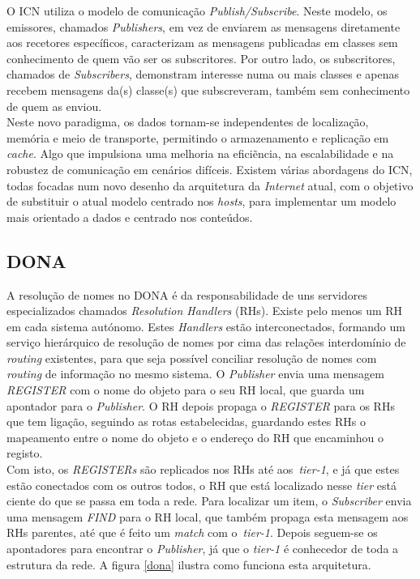 \documentclass[conference]{IEEEtran}
\begin{document}
O ICN utiliza o modelo de comunica\c{c}\~{a}o \textit{Publish/Subscribe}. Neste modelo, os emissores, chamados \textit{Publishers}, em vez de enviarem as mensagens diretamente aos recetores espec\'{i}ficos, caracterizam as mensagens publicadas em classes sem conhecimento de quem v\~{a}o ser os subscritores. Por outro lado, os subscritores, chamados de \textit{Subscribers}, demonstram interesse numa ou mais classes e apenas recebem mensagens da(s) classe(s) que subscreveram, tamb\'{e}m sem conhecimento de quem as enviou.\\ 

Neste novo paradigma, os dados tornam-se independentes de localiza\c{c}\~{a}o, mem\'{o}ria e meio de transporte, permitindo o armazenamento e replica\c{c}\~{a}o em \textit{cache}. Algo que impulsiona uma melhoria na efici\~{e}ncia, na escalabilidade e na robustez de comunica\c{c}\~{a}o em cen\'{a}rios dif\'{i}ceis. Existem v\'{a}rias abordagens do ICN, todas focadas num novo desenho da arquitetura da \textit{Internet} atual, com o objetivo de substituir o atual modelo centrado nos \textit{hosts}, para implementar um modelo mais orientado a dados e centrado nos conte\'{u}dos\cite{surveyICN}.\\



\subsection{DONA}

A resolu\c{c}\~{a}o de nomes no DONA\cite{dona} \'{e} da responsabilidade de uns servidores especializados chamados \textit{Resolution Handlers} (RHs). Existe pelo menos um RH em cada sistema aut\'{o}nomo. Estes \textit{Handlers} est\~{a}o interconectados, formando um servi\c{c}o hier\'{a}rquico de resolu\c{c}\~{a}o de nomes por cima das rela\c{c}\~{o}es interdom\'{i}nio de \textit{routing} existentes, para que seja poss\'{i}vel conciliar resolu\c{c}\~{a}o de nomes com \textit{routing} de informa\c{c}\~{a}o no mesmo sistema. O \textit{Publisher} envia uma mensagem \textit{REGISTER} com o nome do objeto para o seu RH local, que guarda um apontador para o \textit{Publisher}. O RH depois propaga o \textit{REGISTER} para os RHs que tem liga\c{c}\~{a}o, seguindo as rotas estabelecidas, guardando estes RHs o mapeamento entre o nome do objeto e o endere\c{c}o do RH que encaminhou o registo.\\

 Com isto, os \textit{REGISTERs} s\~{a}o replicados nos RHs at\'{e} aos~\textit{tier-1}, e j\'{a} que estes est\~{a}o conectados com os outros todos, o RH que est\'{a} localizado nesse \textit{tier} est\'{a} ciente do que se passa em toda a rede. Para localizar um item, o \textit{Subscriber} envia uma mensagem \textit{FIND} para o RH local, que tamb\'{e}m propaga esta mensagem aos RHs parentes, at\'{e} que \'{e} feito um \textit{match} com o~\textit{tier-1}. Depois seguem-se os apontadores para encontrar o \textit{Publisher}, j\'{a} que o \textit{tier-1} \'{e} conhecedor de toda a estrutura da rede. A figura \ref{dona} ilustra como funciona esta arquitetura.\\
\end{document}

